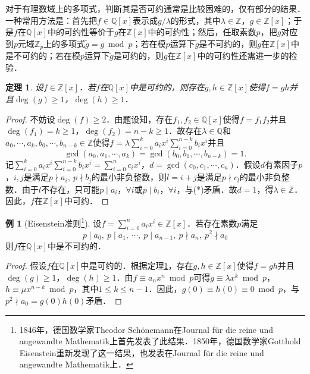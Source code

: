 \documentclass[a4paper,fontset=windows]{ctexbook}
\newtheorem{theorem}{定理}[chapter]
\theoremstyle{definition}
\newtheorem{example}{例}[chapter]
\renewcommand{\le}{\leqslant}
\renewcommand{\ge}{\geqslant}
\begin{document}
对于有理数域上的多项式，判断其是否可约通常是比较困难的，仅有部分的结果．一种常用方法是：首先把$f\in\mathbb{Q}[x]$表示成$g/\lambda$的形式，其中$\lambda\in\mathbb{Z}$，$g\in\mathbb{Z}[x]$；于是$f$在$\mathbb{Q}[x]$中的可约性等价于$g$在$\mathbb{Z}[x]$中的可约性；然后，任取素数$p$，把$g$对应到$p$元域$\mathbb{Z}_p$上的多项式$\tilde{g}=g\bmod p$；若在模$p$运算下$\tilde{g}$是不可约的，则$g$在$\mathbb{Z}[x]$中是不可约的；若在模$p$运算下$\tilde{g}$是可约的，则$g$在$\mathbb{Z}[x]$中的可约性还需进一步的检验．

\begin{theorem}\label{thm11.15}
设$f\in\mathbb{Z}[x]$．若$f$在$\mathbb{Q}[x]$中是可约的，则存在$g,h\in\mathbb{Z}[x]$使得$f=gh$并且$\deg(g)\ge 1$，$\deg(h)\ge 1$．
\end{theorem}

\begin{proof}
不妨设$\deg(f)\ge 2$．由题设知，存在$f_1,f_2\in\mathbb{Q}[x]$使得$f=f_1f_2$并且$\deg(f_1)=k\ge 1$，$\deg(f_2)=n-k\ge 1$．故存在$\lambda\in\mathbb{Q}$和$a_0,\cdots,a_k,b_0,\cdots,b_{n-k}\in\mathbb{Z}$使得$f=\lambda\sum\limits_{i=0}^ka_ix^i\sum\limits_{i=0}^{n-k}b_ix^i$并且
\begin{equation*}
\gcd(a_0,a_1,\cdots,a_k)=\gcd(b_0,b_1,\cdots,b_{n-k})=1.\tag{*}
\end{equation*}
记$\sum\limits_{i=0}^ka_ix^i\sum\limits_{i=0}^{n-k}b_ix^i=\sum\limits_{i=0}^nc_ix^i$，$d=\gcd(c_0,c_1,\cdots,c_n)$．假设$d$有素因子$p$，$i,j$是满足$p\nmid a_i,~p\nmid b_j$的最小非负整数，则$l=i+j$是满足$p\nmid c_l$的最小非负整数．由于$l$不存在，只可能$p\mid a_i$，$\forall i$或$p\mid b_i$，$\forall i$，与(*)矛盾．故$d=1$，得$\lambda\in\mathbb{Z}$．因此，$f$在$\mathbb{Z}[x]$中可约．
\end{proof}

\begin{example}[Eisenstein准则\footnote{1846年，德国数学家Theodor Sch\"onemann在Journal f\"ur die reine und angewandte Mathematik上首先发表了此结果．1850年，德国数学家Gotthold Eisenstein重新发现了这一结果，也发表在Journal f\"ur die reine und angewandte Mathematik上．}]
设$f=\sum\limits_{i=0}^na_ix^i\in\mathbb{Z}[x]$．若存在素数$p$满足
$$p\mid a_0,~p\mid a_1,~\cdots,~p\mid a_{n-1},~p\nmid a_n,~p^2\nmid a_0$$
则$f$在$\mathbb{Q}[x]$中是不可约的．
\end{example}

\begin{proof}
假设$f$在$\mathbb{Q}[x]$中是可约的．根据定理\ref{thm11.15}，存在$g,h\in\mathbb{Z}[x]$使得$f=gh$并且$\deg(g)\ge 1$，$\deg(h)\ge 1$．由$f\equiv a_nx^n\bmod p$可得$g\equiv\lambda x^k\bmod p$，$h\equiv\mu x^{n-k}\bmod p$，其中$1\le k\le n-1$．因此，$g(0)\equiv h(0)\equiv 0\bmod p$，与$p^2\nmid a_0=g(0)h(0)$矛盾．
\end{proof}
\end{document}
